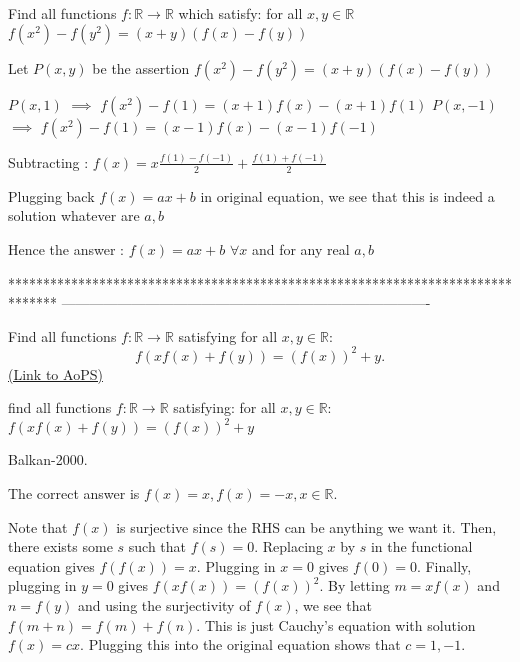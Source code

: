 \begin{solution}
	\begin{tcolorbox}Find all functions $f:\mathbb{R}\to\mathbb{R}$ which satisfy: for all $x,y \in \mathbb{R}$ 
$ f(x^{2})-f(y^{2})=(x+y)(f(x)-f(y)) $\end{tcolorbox}
Let $P(x,y)$ be the assertion $f(x^2)-f(y^2)=(x+y)(f(x)-f(y))$

$P(x,1)$ $\implies$ $f(x^2)-f(1)=(x+1)f(x)-(x+1)f(1)$
$P(x,-1)$ $\implies$ $f(x^2)-f(1)=(x-1)f(x)-(x-1)f(-1)$

Subtracting : $f(x)=x\frac{f(1)-f(-1)}2+\frac{f(1)+f(-1)}2$

Plugging back $f(x)=ax+b$ in original equation, we see that this is indeed a solution whatever are $a,b$

Hence the answer : $\boxed{f(x)=ax+b}$ $\forall x$ and for any real $a,b$
\end{solution}
*******************************************************************************
-------------------------------------------------------------------------------

\begin{problem}
	Find all functions $f:\mathbb{R}\to\mathbb{R}$ satisfying for all $x,y\in\mathbb{R}$: \[ f(xf(x)+f(y))=(f(x))^{2}+y. \]
	\flushright \href{https://artofproblemsolving.com/community/c6h446840}{(Link to AoPS)}
\end{problem}



\begin{solution}
	\begin{tcolorbox}find all functions $f:\mathbb{R}\to\mathbb{R}$ satisfying:
for all $x,y\in\mathbb{R}$: $ f(xf(x)+f(y))=(f(x))^{2}+y $\end{tcolorbox}
Balkan-2000.

The correct answer is 
$\boxed{f(x) =x , f(x)=-x}, x \in \mathbb{R}$.
\end{solution}



\begin{solution}
	Note that $f(x)$ is surjective since the RHS can be anything we want it. Then, there exists some $s$ such that $f(s)=0$. Replacing $x$ by $s$ in the functional equation gives $f(f(x))=x$. Plugging in $x=0$ gives $f(0)=0$. Finally, plugging in $y=0$ gives $f(xf(x))=(f(x))^{2}$. By letting $m=xf(x)$ and $n=f(y)$ and using the surjectivity of $f(x)$, we see that $f(m+n)=f(m)+f(n)$. This is just Cauchy's equation with solution $f(x)=cx$. Plugging this into the original equation shows that $c=1,-1$.
\end{solution}



